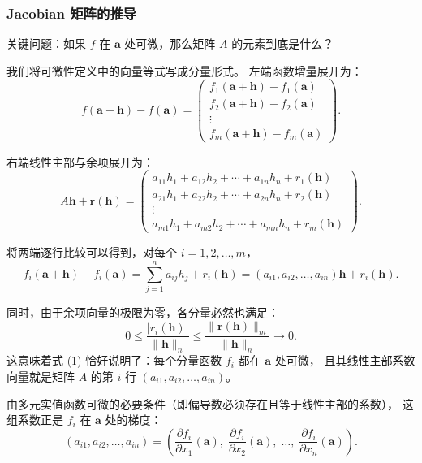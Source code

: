 \documentclass[lang=cn,11pt]{elegantbook}
\begin{document}
\subsubsection*{Jacobian 矩阵的推导}

关键问题：如果 $f$ 在 $\boldsymbol a$ 处可微，那么矩阵 $A$ 的元素到底是什么？

我们将可微性定义中的向量等式写成分量形式。
左端函数增量展开为：
\[
f(\boldsymbol a+\boldsymbol h)-f(\boldsymbol a)
=\begin{pmatrix}
f_1(\boldsymbol a+\boldsymbol h)-f_1(\boldsymbol a)\\
f_2(\boldsymbol a+\boldsymbol h)-f_2(\boldsymbol a)\\
\vdots\\
f_m(\boldsymbol a+\boldsymbol h)-f_m(\boldsymbol a)
\end{pmatrix}.
\]

右端线性主部与余项展开为：
\[
A\boldsymbol h+\boldsymbol r(\boldsymbol h)
=\begin{pmatrix}
a_{11}h_1+a_{12}h_2+\cdots+a_{1n}h_n+r_1(\boldsymbol h)\\
a_{21}h_1+a_{22}h_2+\cdots+a_{2n}h_n+r_2(\boldsymbol h)\\
\vdots\\
a_{m1}h_1+a_{m2}h_2+\cdots+a_{mn}h_n+r_m(\boldsymbol h)
\end{pmatrix}.
\]

将两端逐行比较可以得到，对每个 $i=1,2,\dots,m$，
\[
f_i(\boldsymbol a+\boldsymbol h)-f_i(\boldsymbol a)
=\sum_{j=1}^{n}a_{ij}h_j+r_i(\boldsymbol h)
=(a_{i1},a_{i2},\dots,a_{in})\boldsymbol h+r_i(\boldsymbol h). \tag{1}
\]

同时，由于余项向量的极限为零，各分量必然也满足：
\[
0 \leqslant  \frac{|r_i(\boldsymbol h)|}{\|\boldsymbol h\|_n}
\leq\frac{\|\boldsymbol r(\boldsymbol h)\|_m}{\|\boldsymbol h\|_n}\to 0.
\]
这意味着式 (1) 恰好说明了：每个分量函数 $f_i$ 都在 $\boldsymbol a$ 处可微，
且其线性主部系数向量就是矩阵 $A$ 的第 $i$ 行 $(a_{i1},a_{i2},\dots,a_{in})$。

由多元实值函数可微的必要条件（即偏导数必须存在且等于线性主部的系数），
这组系数正是 $f_i$ 在 $\boldsymbol a$ 处的梯度：
\[
(a_{i1},a_{i2},\dots,a_{in})
=\left(\frac{\partial f_i}{\partial x_1}(\boldsymbol a),\;
       \frac{\partial f_i}{\partial x_2}(\boldsymbol a),\;\dots,\;
       \frac{\partial f_i}{\partial x_n}(\boldsymbol a)\right).
\]
\end{document}

